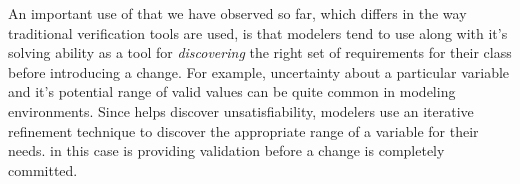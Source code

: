 An important use of \Klang{} that we have observed so far, which
differs in the way traditional verification tools are used, is that
modelers tend to use \Klang{} along with it's solving ability as a
tool for {\em discovering} the right set of requirements for their
class before introducing a change. For example, uncertainty about a
particular variable and it's potential range of valid values can be
quite common in modeling environments. Since \Klang{} helps discover
unsatisfiability, modelers use an iterative refinement technique to
discover the appropriate range of a variable for their needs. \Klang{}
in this case is providing validation before a change is completely
committed.


